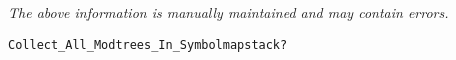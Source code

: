 \label{pkg:collect\_all\_modtrees\_in\_symbolmapstack}

{\tiny \it The above information is manually maintained and may contain errors.}
\begin{verbatim}
Collect_All_Modtrees_In_Symbolmapstack?
\end{verbatim}
